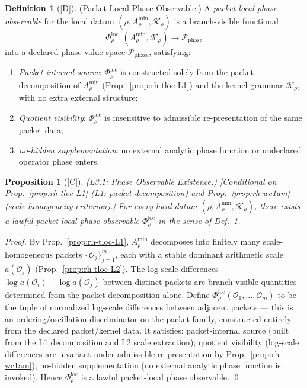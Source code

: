 \documentclass[12pt,oneside]{amsbook}
\theoremstyle{plain}
\newtheorem{proposition}[theorem]{Proposition}
\theoremstyle{definition}
\newtheorem{definition}[theorem]{Definition}
\theoremstyle{remark}
\newcommand{\status}[1]{\textup{[#1]}}
\begin{document}
\begin{definition}[\status{D}]\label{def:rh-packet-phase-observable}
\textup{(Packet-Local Phase Observable.)}
A \emph{packet-local phase observable} for the local datum
$(\rho, A_\rho^{\min}, \mathcal{K}_\rho)$ is a branch-visible
functional
\[
 \Phi_\rho^{\mathrm{loc}}:
 (A_\rho^{\min}, \mathcal{K}_\rho) \to \mathcal{P}_{\mathrm{phase}}
\]
into a declared phase-value space $\mathcal{P}_{\mathrm{phase}}$,
satisfying:
\begin{enumerate}[label=\textup{(\arabic*)}]
 \item \emph{Packet-internal source}: $\Phi_\rho^{\mathrm{loc}}$ is
 constructed solely from the packet decomposition of
 $A_\rho^{\min}$ (Prop.~\ref{prop:rh-tloc-L1}) and the kernel
 grammar $\mathcal{K}_\rho$, with no extra external structure;
 \item \emph{Quotient visibility}: $\Phi_\rho^{\mathrm{loc}}$ is
 insensitive to admissible re-presentation of the same packet data;
 \item \emph{no-hidden supplementation}: no external analytic phase
 function or undeclared operator phase enters.
\end{enumerate}
\end{definition}

\begin{proposition}[\status{C}]\label{prop:rh-L3-observable-existence}
\textup{(L3.1: Phase Observable Existence.)}
\textup{[Conditional on Prop.~\ref{prop:rh-tloc-L1} (L1: packet
decomposition) and Prop.~\ref{prop:rh-wc1am} (scale-homogeneity
criterion).]}
For every local datum $(\rho, A_\rho^{\min}, \mathcal{K}_\rho)$,
there exists a lawful packet-local phase observable
$\Phi_\rho^{\mathrm{loc}}$ in the sense of
Def.~\ref{def:rh-packet-phase-observable}.
\end{proposition}

\begin{proof}
By Prop.~\ref{prop:rh-tloc-L1}, $A_\rho^{\min}$ decomposes into
finitely many scale-homogeneous packets $\{\mathcal{O}_j\}_{j=1}^m$,
each with a stable dominant arithmetic scale $a(\mathcal{O}_j)$
(Prop.~\ref{prop:rh-tloc-L2}). The log-scale differences
$\log a(\mathcal{O}_i) - \log a(\mathcal{O}_j)$ between distinct
packets are branch-visible quantities determined from the packet
decomposition alone. Define
$\Phi_\rho^{\mathrm{loc}}(\mathcal{O}_1, \ldots, \mathcal{O}_m)$
to be the tuple of normalized log-scale differences between
adjacent packets — this is an ordering/oscillation discriminator
on the packet family, constructed entirely from the declared
packet/kernel data. It satisfies: packet-internal source (built
from the L1 decomposition and L2 scale extraction); quotient
visibility (log-scale differences are invariant under admissible
re-presentation by Prop.~\ref{prop:rh-wc1am}); no-hidden
supplementation (no external analytic phase function is invoked).
Hence $\Phi_\rho^{\mathrm{loc}}$ is a lawful packet-local phase
observable. \qed
\end{proof}
\end{document}
